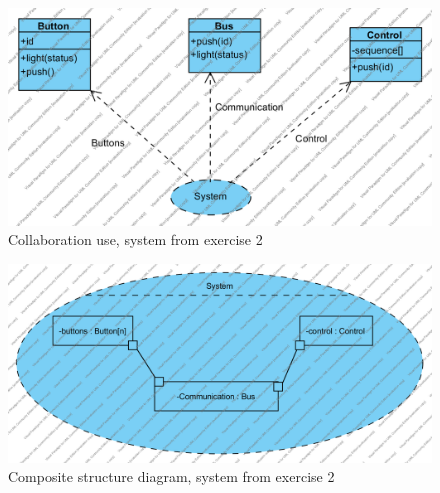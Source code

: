 \documentclass{article}
\begin{document}
\begin{figure}[htbp]
  \centering
  \includegraphics[width=\linewidth]{../class2}
  \caption{Collaboration use, system from exercise 2}
  \label{fig:collabex2}
\end{figure}

\begin{figure}[htbp]
  \centering
  \includegraphics[width=\linewidth]{../comp1}
  \caption{Composite structure diagram, system from exercise 2}
  \label{fig:compex2}
\end{figure}
\end{document}
